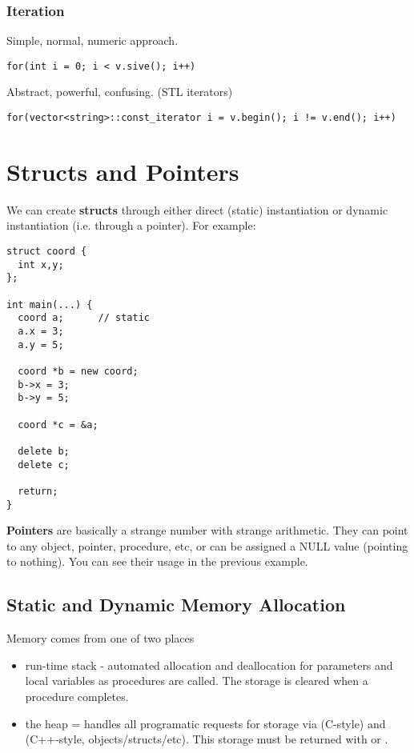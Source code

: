 \documentclass[12pt]{article}
\begin{document}
\subsubsection*{Iteration}
Simple, normal, numeric approach.
\begin{verbatim}
for(int i = 0; i < v.sive(); i++)
\end{verbatim}

Abstract, powerful, confusing. (STL iterators)
\begin{verbatim}
for(vector<string>::const_iterator i = v.begin(); i != v.end(); i++)
\end{verbatim}

\section*{Structs and Pointers}
We can create {\bf structs} through either direct (static) instantiation or dynamic instantiation (i.e. through a pointer). For example:

\begin{verbatim}
struct coord {
  int x,y;
};

int main(...) {
  coord a;      // static
  a.x = 3;
  a.y = 5;

  coord *b = new coord;
  b->x = 3;
  b->y = 5;

  coord *c = &a;

  delete b;
  delete c;

  return;
}
\end{verbatim}

{\bf Pointers} are basically a strange number with strange arithmetic. They can point to any object, pointer, procedure, etc, or can be assigned a NULL value (pointing to nothing). You can see their usage in the previous example.

\subsection*{Static and Dynamic Memory Allocation}
Memory comes from one of two places
\begin{itemize}
\item run-time stack - automated allocation and deallocation for parameters and local variables as procedures are called. The storage is cleared when a procedure completes.
\item the heap = handles all programatic requests for storage via  (C-style) and  (C++-style, objects/structs/etc). This storage must be returned with  or .
\end{itemize}
\end{document}
